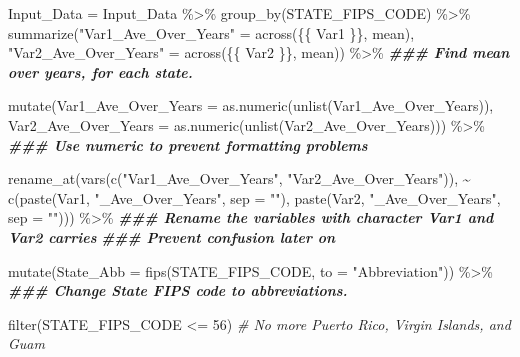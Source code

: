 \documentclass[
]{article}
\newenvironment{Shaded}{\begin{snugshade}}{\end{snugshade}}
\newcommand{\AttributeTok}[1]{\textcolor[rgb]{0.77,0.63,0.00}{#1}}
\newcommand{\CommentTok}[1]{\textcolor[rgb]{0.56,0.35,0.01}{\textit{#1}}}
\newcommand{\DecValTok}[1]{\textcolor[rgb]{0.00,0.00,0.81}{#1}}
\newcommand{\DocumentationTok}[1]{\textcolor[rgb]{0.56,0.35,0.01}{\textbf{\textit{#1}}}}
\newcommand{\FunctionTok}[1]{\textcolor[rgb]{0.00,0.00,0.00}{#1}}
\newcommand{\NormalTok}[1]{#1}
\newcommand{\OtherTok}[1]{\textcolor[rgb]{0.56,0.35,0.01}{#1}}
\newcommand{\SpecialCharTok}[1]{\textcolor[rgb]{0.00,0.00,0.00}{#1}}
\newcommand{\StringTok}[1]{\textcolor[rgb]{0.31,0.60,0.02}{#1}}
\begin{document}
\begin{Shaded}
\begin{Highlighting}[]
\NormalTok{    Input\_Data }\OtherTok{=}\NormalTok{  Input\_Data }\SpecialCharTok{\%\textgreater{}\%} \FunctionTok{group\_by}\NormalTok{(STATE\_FIPS\_CODE) }\SpecialCharTok{\%\textgreater{}\%}
      \FunctionTok{summarize}\NormalTok{(}\StringTok{"Var1\_Ave\_Over\_Years"} \OtherTok{=} \FunctionTok{across}\NormalTok{(\{\{ Var1 \}\}, mean), }
                \StringTok{"Var2\_Ave\_Over\_Years"} \OtherTok{=} \FunctionTok{across}\NormalTok{(\{\{ Var2 \}\}, mean)) }\SpecialCharTok{\%\textgreater{}\%}
      \DocumentationTok{\#\#\# Find mean over years, for each state.}
      
      \FunctionTok{mutate}\NormalTok{(}\AttributeTok{Var1\_Ave\_Over\_Years =} \FunctionTok{as.numeric}\NormalTok{(}\FunctionTok{unlist}\NormalTok{(Var1\_Ave\_Over\_Years)), }
             \AttributeTok{Var2\_Ave\_Over\_Years =} \FunctionTok{as.numeric}\NormalTok{(}\FunctionTok{unlist}\NormalTok{(Var2\_Ave\_Over\_Years))) }\SpecialCharTok{\%\textgreater{}\%}
      \DocumentationTok{\#\#\# Use numeric to prevent formatting problems}
      
      \FunctionTok{rename\_at}\NormalTok{(}\FunctionTok{vars}\NormalTok{(}\FunctionTok{c}\NormalTok{(}\StringTok{"Var1\_Ave\_Over\_Years"}\NormalTok{, }\StringTok{"Var2\_Ave\_Over\_Years"}\NormalTok{)),}
                \SpecialCharTok{\textasciitilde{}} \FunctionTok{c}\NormalTok{(}\FunctionTok{paste}\NormalTok{(Var1, }\StringTok{"\_Ave\_Over\_Years"}\NormalTok{, }\AttributeTok{sep =} \StringTok{""}\NormalTok{),}
                    \FunctionTok{paste}\NormalTok{(Var2, }\StringTok{"\_Ave\_Over\_Years"}\NormalTok{, }\AttributeTok{sep =} \StringTok{""}\NormalTok{))) }\SpecialCharTok{\%\textgreater{}\%}
      \DocumentationTok{\#\#\# Rename the variables with character Var1 and Var2 carries}
      \DocumentationTok{\#\#\# Prevent confusion later on}
      
      \FunctionTok{mutate}\NormalTok{(}\AttributeTok{State\_Abb =} \FunctionTok{fips}\NormalTok{(STATE\_FIPS\_CODE, }\AttributeTok{to =}  \StringTok{"Abbreviation"}\NormalTok{)) }\SpecialCharTok{\%\textgreater{}\%}
      \DocumentationTok{\#\#\# Change State FIPS code to abbreviations.}
      
      \FunctionTok{filter}\NormalTok{(STATE\_FIPS\_CODE }\SpecialCharTok{\textless{}=} \DecValTok{56}\NormalTok{) }
    \CommentTok{\# No more Puerto Rico, Virgin Islands, and Guam}
    

\end{Highlighting}
\end{Shaded}
\end{document}
